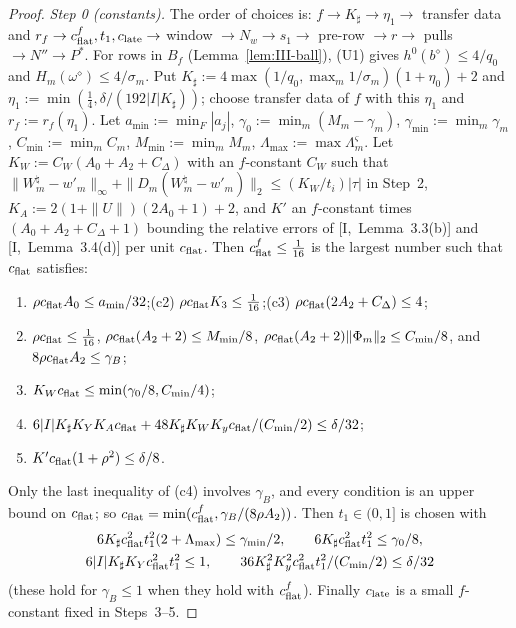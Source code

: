 \documentclass[10pt]{amsart}
\theoremstyle{definition}
\theoremstyle{remark}
\begin{document}
\begin{proof}
\emph{Step 0 (constants).}  The order of choices is: $f\to K_\sharp\to\eta_1\to$
transfer data and $r_f\to c^f_{\rm flat},t_1,c_{\rm late}\to$ window $\to N_w\to
s_1\to$ pre-row $\to r\to$ pulls $\to N''\to P^*$.  For rows in $B_f$
(Lemma~\ref{lem:III-ball}), (U1) gives $h^0(b^\diamond)\le4/q_0$ and
$H_m(\omega^\diamond)\le4/\sigma_m$.  Put $K_\sharp:=4\max(1/q_0,\max_m1/\sigma_m)
(1+\eta_0)+2$ and $\eta_1:=\min(\frac14,\delta/(192|I|K_\sharp))$; choose transfer
data of $f$ with this $\eta_1$ and $r_f:=r_f(\eta_1)$.  Let $a_{\min}:=\min_F|a_j|$,
$\gamma_0:=\min_m(M_m-\gamma_m)$, $\gamma_{\min}:=\min_m\gamma_m$,
$C_{\min}:=\min_mC_m$, $M_{\min}:=\min_mM_m$, $\Lambda_{\max}:=\max\Lambda^\varsigma_m$.
Let $K_W:=C_W(A_0+A_2+C_\Delta)$ with an $f$-constant $C_W$ such that
$\|W^\natural_m-w'_m\|_\infty+\|D_m(W^\natural_m-w'_m)\|_2\le(K_W/t_i)|\tau|$ in
Step~2, $K_A:=2(1+\|U\|)(2A_0+1)+2$, and $K'$ an $f$-constant times
$(A_0+A_2+C_\Delta+1)$ bounding the relative errors of [I,~Lemma~3.3(b)] and
[I,~Lemma~3.4(d)] per unit $c_{\rm flat}$.  Then $c^f_{\rm flat}\le\frac1{16}$ is
the largest number such that $c_{\rm flat}$ satisfies:
\begin{enumerate}
\item[(c1)] $\rho c_{\rm flat}A_0\le a_{\min}/32$;\quad (c2) $\rho c_{\rm flat}K_3
\le\frac1{16}$;\quad (c3) $\rho c_{\rm flat}(2A_2+C_\Delta)\le4$;
\item[(c4)] $\rho c_{\rm flat}\le\frac1{16}$, $\rho c_{\rm flat}(A_2+2)\le M_{\min}/8$,
$\rho c_{\rm flat}(A_2+2)\|\Phi_m\|_2\le C_{\min}/8$, and $8\rho c_{\rm flat}A_2\le
\gamma_B$;
\item[(c5)] $K_Wc_{\rm flat}\le\min(\gamma_0/8,C_{\min}/4)$;
\item[(c6)] $6|I|K_\sharp K_YK_Ac_{\rm flat}+48K_\sharp K_WK_yc_{\rm flat}/(C_{\min}/2)
\le\delta/32$;
\item[(c7)] $K'c_{\rm flat}(1+\rho^2)\le\delta/8$.
\end{enumerate}
Only the last inequality of (c4) involves $\gamma_B$, and every condition is an
upper bound on $c_{\rm flat}$; so $c_{\rm flat}=\min(c^f_{\rm flat},\gamma_B/
(8\rho A_2))$.  Then $t_1\in(0,1]$ is chosen with
\begin{gather*}
 6K_\sharp c_{\rm flat}^2t_1^2(2+\Lambda_{\max})\le\gamma_{\min}/2,\qquad
 6K_\sharp c_{\rm flat}^2t_1^2\le\gamma_0/8,\\
 6|I|K_\sharp K_Yc_{\rm flat}^2t_1^2\le1,\qquad
 36K_\sharp^2K_y^2c_{\rm flat}^2t_1^2/(C_{\min}/2)\le\delta/32
\end{gather*}
(these hold for $\gamma_B\le1$ when they hold with $c^f_{\rm flat}$).  Finally
$c_{\rm late}$ is a small $f$-constant fixed in Steps~3--5.


\end{proof}
\end{document}
